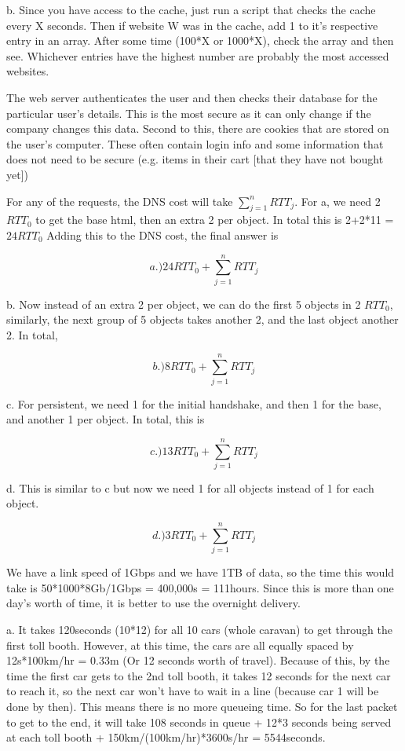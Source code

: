 \documentclass{article}
\begin{document}
b. Since you have access to the cache, just run a script that checks the cache every X seconds. Then if website W was in the cache, add 1 to it's respective entry in an array. After some time (100*X or 1000*X), check the array and then see. Whichever entries have the highest number are probably the most accessed websites.




The web server authenticates the user and then checks their database for the particular user's details. This is the most secure as it can only change if the company changes this data. Second to this, there are cookies that are stored on the user's computer. These often contain login info and some information that does not need to be secure (e.g. items in their cart [that they have not bought yet])



For any of the requests, the DNS cost will take $\sum_{j=1}^n RTT_j $. 
For a, we need 2 $RTT_0$ to get the base html, then an extra 2 per object. In total this is 2+2*11 = $24RTT_0$
Adding this to the DNS cost, the final answer is

$$a.) 24RTT_0 + \sum_{j=1}^n RTT_j $$

b. Now instead of an extra 2 per object, we can do the first 5 objects in 2 $RTT_0$, similarly, the next group of 5 objects takes another 2, and the last object another 2. In total,

$$b.) 8 RTT_0 + \sum_{j=1}^n RTT_j $$

c. For persistent, we need 1 for the initial handshake, and then 1 for the base, and another 1 per object. In total, this is

$$c.) 13 RTT_0 + \sum_{j=1}^n RTT_j $$

d. This is similar to c but now we need 1 for all objects instead of 1 for each object.

$$d.) 3 RTT_0 + \sum_{j=1}^n RTT_j $$



We have a link speed of 1Gbps and we have 1TB of data, so the time this would take is 50*1000*8Gb/1Gbps = 400,000s =  111hours. Since this is more than one day's worth of time, it is better to use the overnight delivery.



a. It takes 120seconds (10*12) for all 10 cars (whole caravan) to get through the first toll booth. However, at this time, the cars are all equally spaced by 12s*100km/hr = 0.33m  (Or 12 seconds worth of travel). Because of this, by the time the first car gets to the 2nd toll booth, it takes 12 seconds for the next car to reach it, so the next car won't have to wait in a line (because car 1 will be done by then). This means there is no more queueing time. So for the last packet to get to the end, it will take 108 seconds in queue + 12*3 seconds being served at each toll booth + 150km/(100km/hr)*3600s/hr = 5544seconds.
\end{document}
